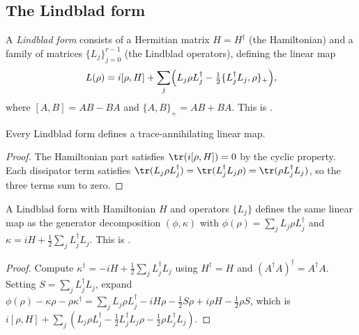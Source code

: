 \subsection{The Lindblad form}

\begin{definition}\label{def:lindblad_form}
    \leanok
    A \emph{Lindblad form} consists of a Hermitian matrix $H = H^\dagger$
    (the Hamiltonian) and a family of matrices $\{L_j\}_{j=0}^{r-1}$
    (the Lindblad operators), defining the linear map
    \[
        L(\rho)
        = i[\rho, H]
        + \sum_{j} \Bigl(        L_j \rho L_j^\dagger
        - \tfrac{1}{2}\{L_j^\dagger L_j, \rho\}_+
        \Bigr),
    \]
    where $[A,B] = AB - BA$ and $\{A,B\}_+ = AB + BA$.
    This is \cite[Equation~(7.21)]{Wolf2012Quantum}.
\end{definition}

\begin{theorem}
    \label{thm:lindbladForm_isTraceAnnihilating}
    \leanok
    Every Lindblad form defines a trace-annihilating linear map.
\end{theorem}

\begin{proof}
    \leanok
    The Hamiltonian part satisfies
    $\tr(i[\rho,H]) = 0$ by the cyclic property.
    Each dissipator term satisfies
    $\tr(L_j \rho L_j^\dagger) = \tr(L_j^\dagger L_j \rho)
        = \tr(\rho L_j^\dagger L_j)$,
    so the three terms sum to zero.
\end{proof}

\begin{theorem}
    \label{thm:lindbladForm_eq_generatorDecomp}
    \leanok
    A Lindblad form with Hamiltonian $H$ and operators $\{L_j\}$ defines
    the same linear map as the generator decomposition $(\phi, \kappa)$
    with $\phi(\rho) = \sum_j L_j \rho L_j^\dagger$ and
    $\kappa = iH + \frac{1}{2}\sum_j L_j^\dagger L_j$.
    This is \cite[Equation~(7.24)]{Wolf2012Quantum}.
\end{theorem}

\begin{proof}
    \leanok
    Compute $\kappa^\dagger = -iH + \frac{1}{2}\sum_j L_j^\dagger L_j$
    using $H^\dagger = H$ and $(A^\dagger A)^\dagger = A^\dagger A$.
    Setting $S = \sum_j L_j^\dagger L_j$, expand
    $\phi(\rho) - \kappa\rho - \rho\kappa^\dagger
        = \sum_j L_j\rho L_j^\dagger - iH\rho - \tfrac{1}{2}S\rho
        + i\rho H - \tfrac{1}{2}\rho S$,
    which is $i[\rho,H] + \sum_j(L_j\rho L_j^\dagger
        - \tfrac{1}{2}L_j^\dagger L_j\rho - \tfrac{1}{2}\rho L_j^\dagger L_j)$.
\end{proof}

